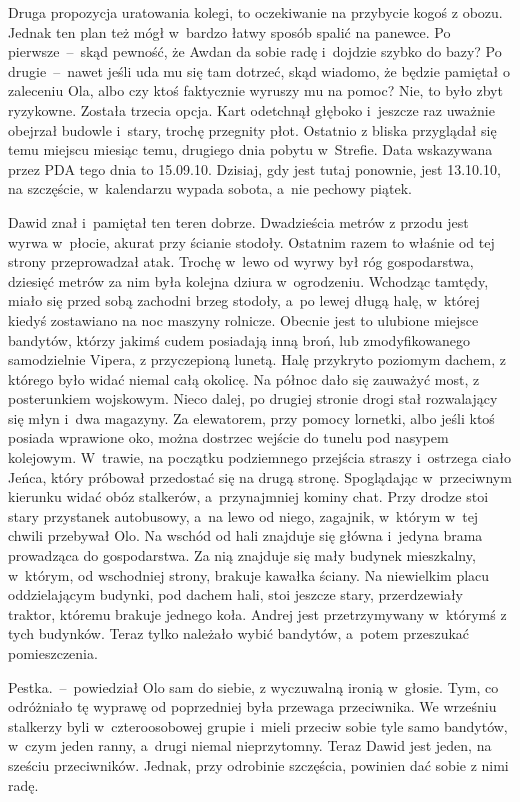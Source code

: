 \documentclass[../MAIN.tex]{subfiles}
\begin{document}
Druga propozycja uratowania kolegi, to oczekiwanie na przybycie kogoś z obozu. Jednak ten plan też mógł w~bardzo łatwy sposób spalić na panewce. Po pierwsze~--~skąd pewność, że Awdan da sobie radę i~dojdzie szybko do bazy? Po drugie~--~nawet jeśli uda mu się tam dotrzeć, skąd wiadomo, że będzie pamiętał o zaleceniu Ola, albo czy ktoś faktycznie wyruszy mu na pomoc? Nie, to było zbyt ryzykowne. Została trzecia opcja.
Kart odetchnął głęboko i~jeszcze raz uważnie obejrzał budowle i~stary, trochę przegnity płot. Ostatnio z bliska przyglądał się temu miejscu miesiąc temu, drugiego dnia pobytu w~Strefie. Data wskazywana przez PDA tego dnia to 15.09.10. Dzisiaj, gdy jest tutaj ponownie, jest 13.10.10, na szczęście, w~kalendarzu wypada sobota, a~nie pechowy piątek.

Dawid znał i~pamiętał ten teren dobrze. Dwadzieścia metrów z przodu jest wyrwa w~płocie, akurat przy ścianie stodoły. Ostatnim razem to właśnie od tej strony przeprowadzał atak. Trochę w~lewo od wyrwy był róg gospodarstwa, dziesięć metrów za nim była kolejna dziura w~ogrodzeniu. Wchodząc tamtędy, miało się przed sobą zachodni brzeg stodoły, a~po lewej długą halę, w~której kiedyś zostawiano na noc maszyny rolnicze. Obecnie jest to ulubione miejsce bandytów, którzy jakimś cudem posiadają inną broń, lub zmodyfikowanego samodzielnie Vipera, z przyczepioną lunetą. Halę przykryto poziomym dachem, z którego było widać niemal całą okolicę. Na północ dało się zauważyć most, z posterunkiem wojskowym. Nieco dalej, po drugiej stronie drogi stał rozwalający się młyn i~dwa magazyny. Za elewatorem, przy pomocy lornetki, albo jeśli ktoś posiada wprawione oko, można dostrzec wejście do tunelu pod nasypem kolejowym. W~trawie, na początku podziemnego przejścia straszy i~ostrzega ciało Jeńca, który próbował przedostać się na
drugą stronę. Spoglądając w~przeciwnym kierunku widać obóz stalkerów, a~przynajmniej kominy chat. Przy drodze stoi stary przystanek autobusowy, a~na lewo od niego, zagajnik, w~którym w~tej chwili przebywał Olo. Na wschód od hali znajduje się główna i~jedyna brama prowadząca do gospodarstwa. Za nią znajduje się mały budynek mieszkalny, w~którym, od wschodniej strony, brakuje kawałka ściany. Na niewielkim placu oddzielającym budynki, pod dachem hali, stoi jeszcze stary, przerdzewiały traktor, któremu brakuje jednego koła.
Andrej jest przetrzymywany w~którymś z tych budynków. Teraz tylko należało wybić bandytów, a~potem przeszukać pomieszczenia.

\sd
\xx Pestka.~--~powiedział Olo sam do siebie, z wyczuwalną ironią w~głosie.
\qm
Tym, co odróżniało tę wyprawę od poprzedniej była przewaga przeciwnika. We wrześniu stalkerzy byli w~czteroosobowej grupie i~mieli przeciw sobie tyle samo bandytów, w~czym jeden ranny, a~drugi niemal nieprzytomny. Teraz Dawid jest jeden, na sześciu przeciwników. Jednak, przy odrobinie szczęścia, powinien dać sobie z nimi radę.
\end{document}
